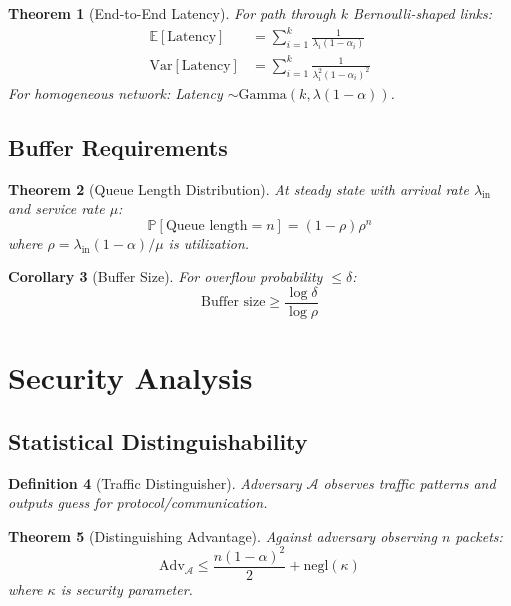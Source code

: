 \documentclass[11pt,final]{article}
\newcommand{\Expect}{\mathbb{E}}
\newcommand{\Var}{\text{Var}}
\newtheorem{theorem}{Theorem}[section]
\newtheorem{corollary}[theorem]{Corollary}
\newtheorem{definition}[theorem]{Definition}
\begin{document}
\begin{theorem}[End-to-End Latency]
For path through $k$ Bernoulli-shaped links:
\begin{align}
\Expect[\text{Latency}] &= \sum_{i=1}^k \frac{1}{\lambda_i(1-\alpha_i)} \\
\Var[\text{Latency}] &= \sum_{i=1}^k \frac{1}{\lambda_i^2(1-\alpha_i)^2}
\end{align}
For homogeneous network: Latency $\sim \text{Gamma}(k, \lambda(1-\alpha))$.
\end{theorem}

\subsection{Buffer Requirements}

\begin{theorem}[Queue Length Distribution]
At steady state with arrival rate $\lambda_{\text{in}}$ and service rate $\mu$:
\begin{equation}
\mathbb{P}[\text{Queue length} = n] = (1-\rho)\rho^n
\end{equation}
where $\rho = \lambda_{\text{in}}(1-\alpha)/\mu$ is utilization.
\end{theorem}

\begin{corollary}[Buffer Size]
For overflow probability $\leq \delta$:
\begin{equation}
\text{Buffer size} \geq \frac{\log \delta}{\log \rho}
\end{equation}
\end{corollary}

\section{Security Analysis}

\subsection{Statistical Distinguishability}

\begin{definition}[Traffic Distinguisher]
Adversary $\mathcal{A}$ observes traffic patterns and outputs guess for protocol/communication.
\end{definition}

\begin{theorem}[Distinguishing Advantage]
Against adversary observing $n$ packets:
\begin{equation}
\text{Adv}_{\mathcal{A}} \leq \frac{n(1-\alpha)^2}{2} + \text{negl}(\kappa)
\end{equation}
where $\kappa$ is security parameter.
\end{theorem}
\end{document}

